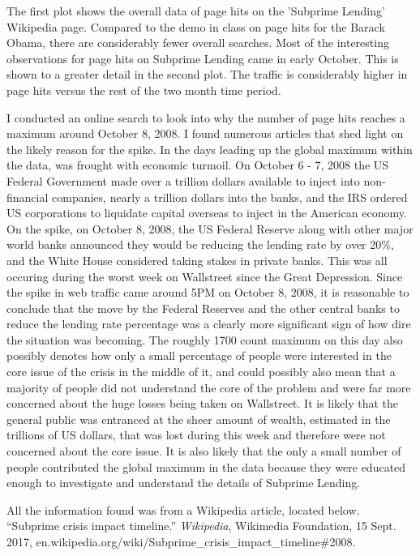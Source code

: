 \documentclass{article}\usepackage[]{graphicx}\usepackage[]{color}
\begin{document}
The first plot shows the overall data of page hits on the 'Subprime Lending' Wikipedia page.  Compared to the demo in class on page hits for the Barack Obama, there are considerably fewer overall searches.  Most of the interesting observations for page hits on Subprime Lending came in early October.  This is shown to a greater detail in the second plot.  The traffic is considerably higher in page hits versus the rest of the two month time period.  
\par I conducted an online search to look into why the number of page hits reaches a maximum around October 8, 2008.  I found numerous articles that shed light on the likely reason for the spike.  In the days leading up the global maximum within the data, was frought with economic turmoil.  On October 6 - 7, 2008 the US Federal Government made over a trillion dollars available to inject into non-financial companies, nearly a trillion dollars into the banks, and the IRS ordered US corporations to liquidate capital overseas to inject in the American economy.  On the spike, on October 8, 2008, the US Federal Reserve along with other major world banks announced they would be reducing the lending rate by over 20\%, and the White House considered taking stakes in private banks.  This was all occuring during the worst week on Wallstreet since the Great Depression.  Since the spike in web traffic came around 5PM on October 8, 2008, it is reasonable to conclude that the move by the Federal Reserves and the other central banks to reduce the lending rate percentage was a clearly more significant sign of how dire the situation was becoming.  The roughly 1700 count maximum on this day also possibly denotes how only a small percentage of people were interested in the core issue of the crisis in the middle of it, and could possibly also mean that a majority of people did not understand the core of the problem and were far more concerned about the huge losses being taken on Wallstreet.  It is likely that the general public was entranced at the sheer amount of wealth, estimated in the trillions of US dollars, that was lost during this week and therefore were not concerned about the core issue.  It is also likely that the only a small number of people contributed the global maximum in the data because they were educated enough to investigate and understand the details of Subprime Lending.
\par All the information found was from a Wikipedia article, located below.
\newline
\newline
“Subprime crisis impact timeline.” \emph{Wikipedia}, Wikimedia Foundation, 15 Sept. 2017, 
\newline
en.wikipedia.org/wiki/Subprime\_crisis\_impact\_timeline\#2008.
\end{document}
